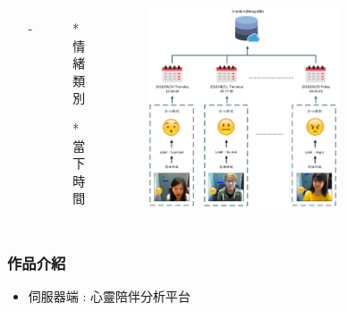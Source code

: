 \documentclass[10pt, conference, compsocconf]{beamer}
\begin{document}
\begin{CJK}{UTF8}{}
\begin{frame}
\begin{columns}
\begin{itemize}
\vspace{-25mm}
\item[-] \large{}
\end{itemize}
\begin{itemize}
\item[*]  情緒類別\\
\vspace{2mm}

\item[*] 當下時間\\
\vspace{2mm}

\end{itemize}
\vspace{-4mm}
\begin{figure}[!t]
\begin{flushright}
\includegraphics[width=0.7\textwidth]{Figures/db.pdf}
\end{flushright}
\end{figure}
\end{columns}
\end{frame}


\begin{frame}
\frametitle{作品介紹}
\begin{itemize}
\item \Large 伺服器端 : 心靈陪伴分析平台
\end{itemize}


\end{frame}
\end{CJK}
\end{document}
